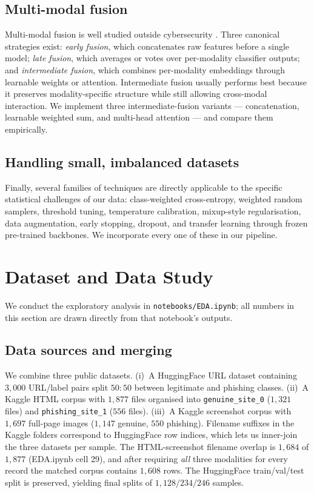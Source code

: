 \documentclass[conference]{IEEEtran}
\begin{document}
\subsection{Multi-modal fusion}
Multi-modal fusion is well studied outside cybersecurity
\cite{multimodal-survey}. Three canonical strategies exist:
\emph{early fusion}, which concatenates raw features before a
single model; \emph{late fusion}, which averages or votes over
per-modality classifier outputs; and \emph{intermediate fusion},
which combines per-modality embeddings through learnable weights
or attention. Intermediate fusion usually performs best because
it preserves modality-specific structure while still allowing
cross-modal interaction. We implement three intermediate-fusion
variants --- concatenation, learnable weighted sum, and multi-head
attention \cite{attn} --- and compare them empirically.

\subsection{Handling small, imbalanced datasets}
Finally, several families of techniques are directly applicable to
the specific statistical challenges of our data:
class-weighted cross-entropy, weighted random samplers, threshold
tuning, temperature calibration, mixup-style regularisation, data
augmentation, early stopping, dropout, and transfer learning
through frozen pre-trained backbones. We incorporate every one of
these in our pipeline.

\section{Dataset and Data Study}
We conduct the exploratory analysis in
\texttt{notebooks/EDA.ipynb}; all numbers in this section are drawn
directly from that notebook's outputs.

\subsection{Data sources and merging}
We combine three public datasets. (i)~A HuggingFace URL dataset
containing $3{,}000$ URL/label pairs split $50{:}50$ between
legitimate and phishing classes. (ii)~A Kaggle HTML corpus with
$1{,}877$ files organised into \texttt{genuine\_site\_0} ($1{,}321$
files) and \texttt{phishing\_site\_1} ($556$ files). (iii)~A Kaggle
screenshot corpus with $1{,}697$ full-page images
($1{,}147$ genuine, $550$ phishing). Filename suffixes in the
Kaggle folders correspond to HuggingFace row indices, which lets us
inner-join the three datasets per sample. The HTML-screenshot
filename overlap is $1{,}684$ of $1{,}877$ (EDA.ipynb cell 29), and
after requiring \emph{all} three modalities for every record the
matched corpus contains $1{,}608$ rows. The HuggingFace train/val/test
split is preserved, yielding final splits of $1{,}128/234/246$
samples.
\end{document}
